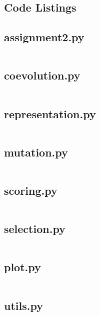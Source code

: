 \documentclass[11pt,a4paper]{article}
\begin{document}
\begin{appendices}
\newpage
\section{Code Listings}
\subsection{assignment2.py}
\inputminted{python}{../code/assignment2.py}\newpage
\subsection{coevolution.py}
\inputminted{python}{../code/coevolution.py}\newpage
\subsection{representation.py}
\inputminted{python}{../code/representation.py}\newpage
\subsection{mutation.py}
\inputminted{python}{../code/mutation.py}\newpage
\subsection{scoring.py}
\inputminted{python}{../code/scoring.py}\newpage
\subsection{selection.py}
\inputminted{python}{../code/selection.py}\newpage
\subsection{plot.py}
\inputminted{python}{../code/plot.py}\newpage
\subsection{utils.py}
\inputminted{python}{../code/utils.py}\newpage


\end{appendices}
\end{document}

